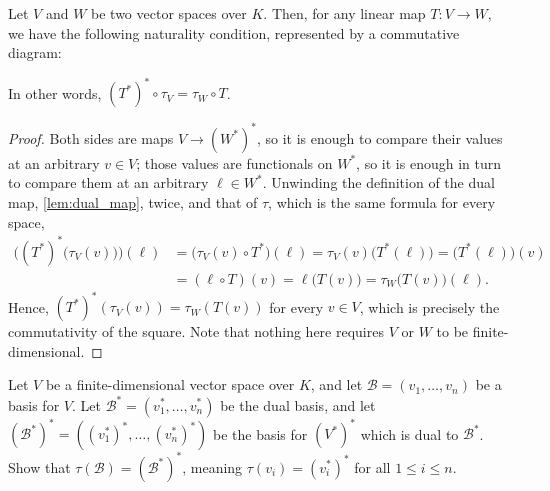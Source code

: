 \begin{proposition*}
\label{prop:naturality_of_tau}
Let $V$ and $W$ be two vector spaces over $K$. Then, for any linear map $T \colon V \to W$, we have the following naturality condition, represented by a commutative diagram:

\begin{center}
\end{center}
In other words, $(T^*)^* \circ \tau_V = \tau_W \circ T$.
\end{proposition*}

\begin{proof}
Both sides are maps $V \to (W^*)^*$, so it is enough to compare their values at an arbitrary $v \in V$; those values are functionals on $W^*$, so it is enough in turn to compare them at an arbitrary $\ell \in W^*$. Unwinding the definition of the dual map, \cref{lem:dual_map}, twice, and that of $\tau$, which is the same formula for every space,
\begin{align*}
\Big( (T^*)^*\big(\tau_V(v)\big) \Big)(\ell)
  &= \big(\tau_V(v) \circ T^*\big)(\ell) = \tau_V(v)\big(T^*(\ell)\big) = \big(T^*(\ell)\big)(v) \\
  &= (\ell \circ T)(v) = \ell\big(T(v)\big) = \tau_W\big(T(v)\big)(\ell).
\end{align*}
Hence, $(T^*)^*(\tau_V(v)) = \tau_W(T(v))$ for every $v \in V$, which is precisely the commutativity of the square. Note that nothing here requires $V$ or $W$ to be finite-di\-men\-sional.
\end{proof}

\begin{exercise}
  \label{exc:tau_on_dual_bases}
  Let $V$ be a finite-di\-men\-sional vector space over $K$, and let $\mathcal{B} = (v_1, \dots, v_n)$ be a basis for $V$. Let $\mathcal{B}^* = (v_1^*, \dots, v_n^*)$ be the dual basis, and let $(\mathcal{B}^*)^* = ((v_1^*)^*, \dots, (v_n^*)^*)$ be the basis for $(V^*)^*$ which is dual to $\mathcal{B}^*$. Show that $\tau(\mathcal{B}) = (\mathcal{B}^*)^*$, meaning $\tau(v_i) = (v_i^*)^*$ for all $1 \leq i \leq n$.
\end{exercise}

